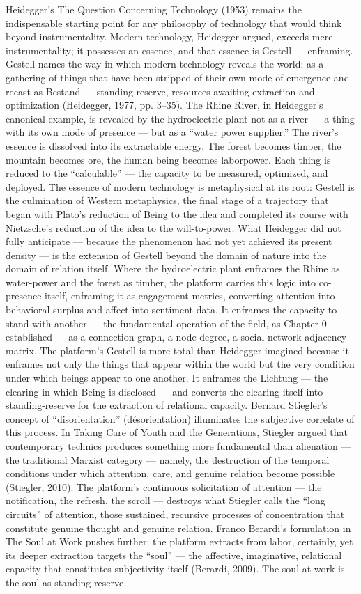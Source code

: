 Heidegger’s The Question Concerning Technology (1953) remains the indispensable starting point for any philosophy of technology that would think beyond instrumentality. Modern technology, Heidegger argued, exceeds mere instrumentality; it possesses an essence, and that essence is Gestell — enframing. Gestell names the way in which modern technology reveals the world: as a gathering of things that have been stripped of their own mode of emergence and recast as Bestand — standing-reserve, resources awaiting extraction and optimization (Heidegger, 1977, pp. 3–35). The Rhine River, in Heidegger’s canonical example, is revealed by the hydroelectric plant not as a river — a thing with its own mode of presence — but as a “water power supplier.” The river’s essence is dissolved into its extractable energy. The forest becomes timber, the mountain becomes ore, the human being becomes laborpower. Each thing is reduced to the “calculable” — the capacity to be measured, optimized, and deployed. The essence of modern technology is metaphysical at its root: Gestell is the culmination of Western metaphysics, the final stage of a trajectory that began with Plato’s reduction of Being to the idea and completed its course with Nietzsche’s reduction of the idea to the will-to-power. What Heidegger did not fully anticipate — because the phenomenon had not yet achieved its present density — is the extension of Gestell beyond the domain of nature into the domain of relation itself. Where the hydroelectric plant enframes the Rhine as water-power and the forest as timber, the platform carries this logic into co-presence itself, enframing it as engagement metrics, converting attention into behavioral surplus and affect into sentiment data. It enframes the capacity to stand with another — the fundamental operation of the field, as Chapter 0 established — as a connection graph, a node degree, a social network adjacency matrix. The platform’s Gestell is more total than Heidegger imagined because it enframes not only the things that appear within the world but the very condition under which beings appear to one another. It enframes the Lichtung — the clearing in which Being is disclosed — and converts the clearing itself into standing-reserve for the extraction of relational capacity. Bernard Stiegler’s concept of “disorientation” (désorientation) illuminates the subjective correlate of this process. In Taking Care of Youth and the Generations, Stiegler argued that contemporary technics produces something more fundamental than alienation — the traditional Marxist category — namely, the destruction of the temporal conditions under which attention, care, and genuine relation become possible (Stiegler, 2010). The platform’s continuous solicitation of attention — the notification, the refresh, the scroll — destroys what Stiegler calls the “long circuits” of attention, those sustained, recursive processes of concentration that constitute genuine thought and genuine relation. Franco Berardi’s formulation in The Soul at Work pushes further: the platform extracts from labor, certainly, yet its deeper extraction targets the “soul” — the affective, imaginative, relational capacity that constitutes subjectivity itself (Berardi, 2009). The soul at work is the soul as standing-reserve.

